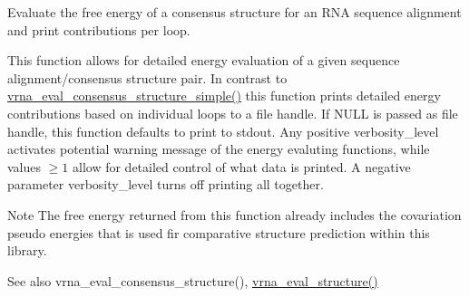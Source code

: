 Evaluate the free energy of a consensus structure for an R\+NA sequence alignment and print contributions per loop. 

This function allows for detailed energy evaluation of a given sequence alignment/consensus structure pair. In contrast to \mbox{\hyperlink{group__eval_ga7762c3a7bdcbc3a14ef93259d322c7d6}{vrna\+\_\+eval\+\_\+consensus\+\_\+structure\+\_\+simple()}} this function prints detailed energy contributions based on individual loops to a file handle. If N\+U\+LL is passed as file handle, this function defaults to print to stdout. Any positive {\ttfamily verbosity\+\_\+level} activates potential warning message of the energy evaluting functions, while values $ \ge 1 $ allow for detailed control of what data is printed. A negative parameter {\ttfamily verbosity\+\_\+level} turns off printing all together.

\begin{DoxyNote}{Note}
The free energy returned from this function already includes the covariation pseudo energies that is used fir comparative structure prediction within this library.
\end{DoxyNote}
\begin{DoxySeeAlso}{See also}
vrna\+\_\+eval\+\_\+consensus\+\_\+structure(), \mbox{\hyperlink{group__eval_ga58f199f1438d794a265f3b27fc8ea631}{vrna\+\_\+eval\+\_\+structure()}}
\end{DoxySeeAlso}

